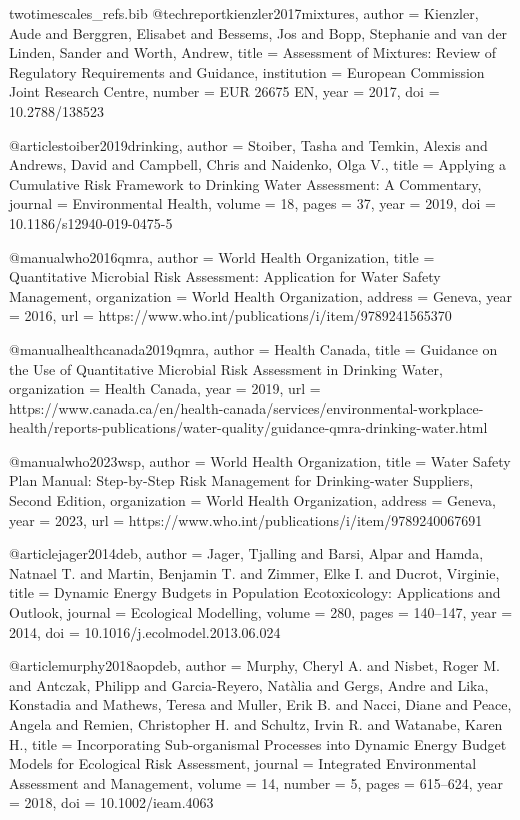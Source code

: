 \begin{filecontents*}{twotimescales_refs.bib}
	@techreport{kienzler2017mixtures,
		author      = {Kienzler, Aude and Berggren, Elisabet and Bessems, Jos and Bopp, Stephanie and van der Linden, Sander and Worth, Andrew},
		title       = {Assessment of Mixtures: Review of Regulatory Requirements and Guidance},
		institution = {European Commission Joint Research Centre},
		number      = {EUR 26675 EN},
		year        = {2017},
		doi         = {10.2788/138523}
	}
	
	@article{stoiber2019drinking,
		author  = {Stoiber, Tasha and Temkin, Alexis and Andrews, David and Campbell, Chris and Naidenko, Olga V.},
		title   = {Applying a Cumulative Risk Framework to Drinking Water Assessment: A Commentary},
		journal = {Environmental Health},
		volume  = {18},
		pages   = {37},
		year    = {2019},
		doi     = {10.1186/s12940-019-0475-5}
	}
	
	@manual{who2016qmra,
		author       = {{World Health Organization}},
		title        = {Quantitative Microbial Risk Assessment: Application for Water Safety Management},
		organization = {World Health Organization},
		address      = {Geneva},
		year         = {2016},
		url          = {https://www.who.int/publications/i/item/9789241565370}
	}
	
	@manual{healthcanada2019qmra,
		author       = {{Health Canada}},
		title        = {Guidance on the Use of Quantitative Microbial Risk Assessment in Drinking Water},
		organization = {Health Canada},
		year         = {2019},
		url          = {https://www.canada.ca/en/health-canada/services/environmental-workplace-health/reports-publications/water-quality/guidance-qmra-drinking-water.html}
	}
	
	@manual{who2023wsp,
		author       = {{World Health Organization}},
		title        = {Water Safety Plan Manual: Step-by-Step Risk Management for Drinking-water Suppliers, Second Edition},
		organization = {World Health Organization},
		address      = {Geneva},
		year         = {2023},
		url          = {https://www.who.int/publications/i/item/9789240067691}
	}
	
	@article{jager2014deb,
		author  = {Jager, Tjalling and Barsi, Alpar and Hamda, Natnael T. and Martin, Benjamin T. and Zimmer, Elke I. and Ducrot, Virginie},
		title   = {Dynamic Energy Budgets in Population Ecotoxicology: Applications and Outlook},
		journal = {Ecological Modelling},
		volume  = {280},
		pages   = {140--147},
		year    = {2014},
		doi     = {10.1016/j.ecolmodel.2013.06.024}
	}
	
	@article{murphy2018aopdeb,
		author  = {Murphy, Cheryl A. and Nisbet, Roger M. and Antczak, Philipp and Garcia-Reyero, Nat{\`a}lia and Gergs, Andre and Lika, Konstadia and Mathews, Teresa and Muller, Erik B. and Nacci, Diane and Peace, Angela and Remien, Christopher H. and Schultz, Irvin R. and Watanabe, Karen H.},
		title   = {Incorporating Sub-organismal Processes into Dynamic Energy Budget Models for Ecological Risk Assessment},
		journal = {Integrated Environmental Assessment and Management},
		volume  = {14},
		number  = {5},
		pages   = {615--624},
		year    = {2018},
		doi     = {10.1002/ieam.4063}
	}
	

\end{filecontents*}
